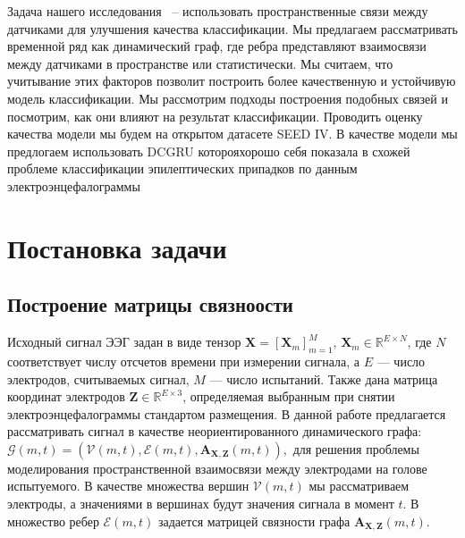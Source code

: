 \documentclass[12pt, twoside]{article}
\begin{document}
Задача нашего исследования ~-- использовать пространственные связи между датчиками для улучшения качества классификации. Мы предлагаем рассматривать временной ряд как динамический граф, где ребра представляют взаимосвязи между датчиками в пространстве или статистически. Мы считаем, что учитывание этих факторов позволит построить более качественную и устойчивую модель классификации. Мы рассмотрим подходы построения подобных связей и посмотрим, как они влияют на результат классификации. Проводить оценку качества модели мы будем на открытом датасете SEED IV. В качестве модели мы предлогаем использовать DCGRU которояхорошо себя показала в схожей проблеме классификации эпилептических припадков по данным электроэнцефалограммы \cite{DCGRU}


\section{Постановка задачи}

\subsection{Построение матрицы связноости}


Исходный сигнал ЭЭГ задан в виде тензор $\mathbf{X} = [\mathbf{X}_m]_{m=1}^M$, $\mathbf{X}_m \in \mathbb{R}^{E \times N}$, где $N$ соответствует числу отсчетов времени при измерении сигнала, а $E$ — число электродов, считываемых сигнал, $M$ — число испытаний. Также дана матрица координат электродов $\mathbf{Z} \in \mathbb{R}^{E \times 3}$, определяемая выбранным при снятии электроэнцефалограммы стандартом размещения. В данной работе предлагается рассматривать сигнал в качестве неориентированного динамического графа: \( \mathcal{G}(m,t) = \left( \mathcal{V}(m,t), \mathcal{E}(m,t), \mathbf{A}_{\mathbf{X},\mathbf{Z}}(m,t) \right),\) для решения проблемы моделирования пространственной взаимосвязи между электродами на голове испытуемого. В качестве множества вершин $\mathcal{V}(m,t)$ мы рассматриваем электроды, а значениями в вершинах будут значения сигнала в момент $t$. В множество ребер $\mathcal{E}(m,t)$ задается матрицей связности графа $\mathbf{A}_{\mathbf{X},\mathbf{Z}}(m,t)$.
\end{document}
